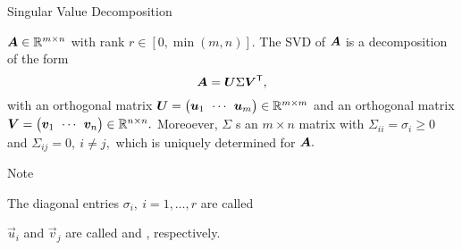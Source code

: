 \documentclass[fleqn,aspectratio=169]{beamer}
\begin{document}
\begin{frame}{Singular Value Decomposition}

\plitemsep 0.1in

\bci 
\item \thm $\bm{A} \in {\mathbb R}^{m \times n}$ with rank $r \in [0,\min(m,n)].$ The SVD of $\bm{A}$ is a decomposition of the form 
{
$$
\bm{A} = \bm{U} \Sigma {\bm{V}}^{\mathsf{T}},
$$
}
{
\vspace{-0.3cm}
}
with an orthogonal matrix $\mU=\rowvec{\vec{u}_1 &\cdots &\vec{u}_m } \in \realmm$ and an orthogonal matrix $\mV=\rowvec{\vec{v}_1 &\cdots &\vec{v}_n} \in \realnn.$ Moreoever, $\Sigma$ s an $m \times n$ matrix with $\Sigma_{ii} = \sigma_i \ge 0$ and $\Sigma_{ij} =0, \ i\neq j,$ which is uniquely determined for $\bm{A}.$

\medskip
\item Note
\bci
\item The diagonal entries $\sigma_i, \ i=1,\ldots, r$ are called    
\item $\vec{u}_i$ and $\vec{v}_j$ are called  and , respectively. 
\eci
\eci
\end{frame}
\end{document}
